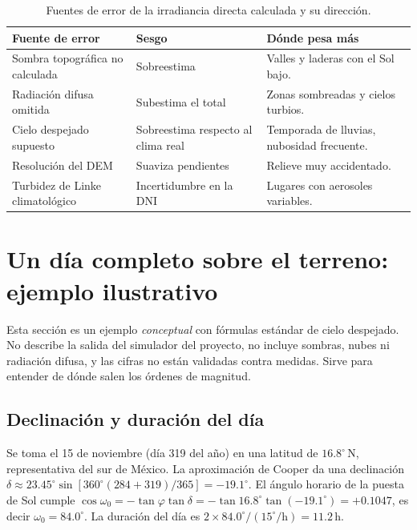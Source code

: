 \documentclass[11pt,a4paper]{article}
\begin{document}
\begin{table}[htbp]
\centering\small
\begin{tabularx}{\linewidth}{p{.28\linewidth}p{.18\linewidth}X}
\toprule
\textbf{Fuente de error} & \textbf{Sesgo} & \textbf{Dónde pesa más}\\\midrule
Sombra topográfica no calculada & Sobreestima & Valles y laderas con el Sol bajo.\\
Radiación difusa omitida & Subestima el total & Zonas sombreadas y cielos turbios.\\
Cielo despejado supuesto & Sobreestima respecto al clima real & Temporada de lluvias, nubosidad frecuente.\\
Resolución del DEM & Suaviza pendientes & Relieve muy accidentado.\\
Turbidez de Linke climatológico & Incertidumbre en la DNI & Lugares con aerosoles variables.\\\bottomrule
\end{tabularx}
\caption{Fuentes de error de la irradiancia directa calculada y su dirección.}
\label{tab:errores-solar}
\end{table}


\section{Un día completo sobre el terreno: ejemplo ilustrativo}
\label{sec:solar-dia}

\begin{atencion}
Esta sección es un ejemplo \emph{conceptual} con fórmulas estándar de cielo despejado. No describe la salida del
simulador del proyecto, no incluye sombras, nubes ni radiación difusa, y las cifras no están validadas contra
medidas. Sirve para entender de dónde salen los órdenes de magnitud.
\end{atencion}

\subsection{Declinación y duración del día}

Se toma el 15 de noviembre (día 319 del año) en una latitud de $16.8^\circ$\,N, representativa del sur de
México. La aproximación de Cooper da una declinación
$\delta\approx23.45^\circ\sin[360^\circ(284+319)/365]=-19.1^\circ$.
El ángulo horario de la puesta de Sol cumple $\cos\omega_0=-\tan\varphi\tan\delta=-\tan16.8^\circ\tan(-19.1^\circ)
=+0.1047$, es decir $\omega_0=84.0^\circ$. La duración del día es $2\times84.0^\circ/(15^\circ/\mathrm{h})=11.2$\,h.
\end{document}
